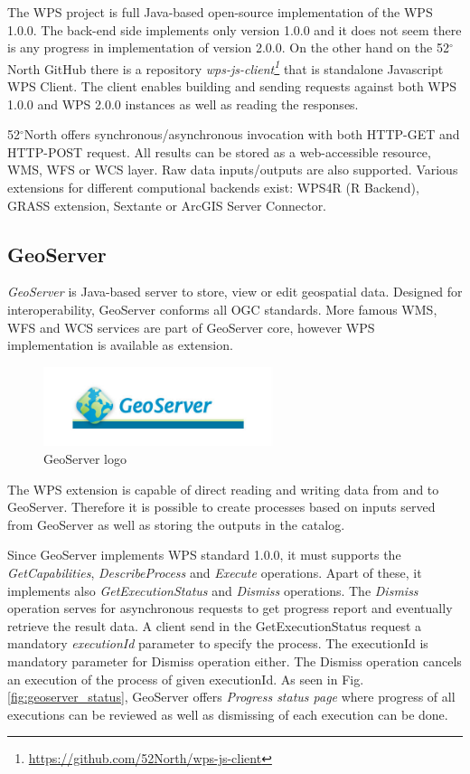 The  WPS project is full Java-based open-source implementation of the WPS 1.0.0. The back-end side implements only version 1.0.0 and it
does not seem there is any progress in implementation of version 2.0.0. On the other hand on the 52$^{\circ}$North GitHub there is a
repository \textit{wps-js-client\footnote{\url{https://github.com/52North/wps-js-client}}} that is standalone Javascript WPS Client. 
The client enables building and sending requests against both WPS 1.0.0 and WPS 2.0.0 instances as well as reading the responses.

52$^{\circ}$North offers synchronous/asynchronous invocation with both HTTP-GET and HTTP-POST request. All results can be stored as
a web-accessible resource, WMS, WFS or WCS layer. Raw data inputs/outputs are also supported. Various extensions for different
computional backends exist: WPS4R (R Backend), GRASS extension, Sextante or ArcGIS Server Connector.

\subsection{GeoServer}
\textit{GeoServer} is Java-based server to store, view or edit geospatial data. Designed for interoperability, GeoServer conforms
all OGC standards. More famous WMS, WFS and WCS services are part of GeoServer core, however WPS implementation is available as 
extension.

\begin{figure}[h!]
\centering
\includegraphics[width=0.6\textwidth]{img/geoserver.jpg}
\caption{GeoServer logo}
\label{fig:geoserver_logo}
\end{figure}

The WPS extension is capable of direct reading and writing data from and to GeoServer. Therefore it is possible to create processes
based on inputs served from GeoServer as well as storing the outputs in the catalog.

Since GeoServer implements WPS standard 1.0.0, it must supports the \textit{GetCapabilities}, \textit{DescribeProcess} and \textit{Execute}
operations. Apart of these, it implements also \textit{GetExecutionStatus} and \textit{Dismiss} operations. The \textit{Dismiss} operation
serves for asynchronous requests to get progress report and eventually retrieve the result data. A client send in the GetExecutionStatus
request a mandatory \textit{executionId} parameter to specify the process. The executionId is mandatory parameter for Dismiss operation
either. The Dismiss operation cancels an execution of the process of given executionId. As seen in Fig. \ref{fig:geoserver_status},
GeoServer offers \textit{Progress status page} where progress of all executions can be reviewed as well as dismissing of each execution
can be done.

